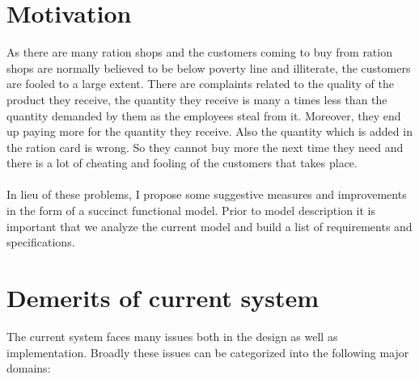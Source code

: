 \documentclass{article}
\begin{document}
\section{Motivation}

As there are many ration shops and the customers coming to buy from ration shops are normally believed to be below poverty line and illiterate, the customers are fooled to a large extent. There are complaints related to the quality of the product they receive, the quantity they receive is many a times less than the quantity demanded by them as the employees steal from it. Moreover, they end up paying more for the quantity they receive. Also the quantity which is added in the ration card is wrong. So they cannot buy more the next time they need and there is a lot of cheating and fooling of the customers that takes place.\\ \\ In lieu of these problems, I propose some suggestive measures and improvements in the form of a succinct functional model. Prior to model description it is important that we analyze the current model and build a list of requirements and specifications. 

\section{Demerits of current system}

The current system faces many issues both in the design as well as implementation. Broadly these issues can be categorized into the following major domains:
\end{document}

